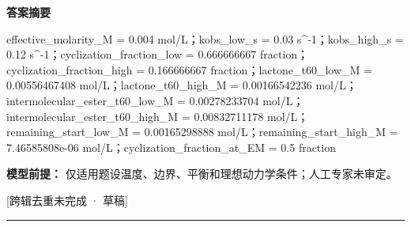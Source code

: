 \documentclass[UTF8,11pt,a4paper]{ctexart}
\begin{document}
\noindent\textbf{答案摘要}\par
effective\_molarity\_M = 0.004 mol/L；kobs\_low\_s = 0.03 s\textasciicircum{}-1；kobs\_high\_s = 0.12 s\textasciicircum{}-1；cyclization\_fraction\_low = 0.666666667 fraction；cyclization\_fraction\_high = 0.166666667 fraction；lactone\_t60\_low\_M = 0.00556467408 mol/L；lactone\_t60\_high\_M = 0.00166542236 mol/L；intermolecular\_ester\_t60\_low\_M = 0.00278233704 mol/L；intermolecular\_ester\_t60\_high\_M = 0.00832711178 mol/L；remaining\_start\_low\_M = 0.00165298888 mol/L；remaining\_start\_high\_M = 7.46585808e-06 mol/L；cyclization\_fraction\_at\_EM = 0.5 fraction\par
\noindent\textbf{模型前提：}
仅适用题设温度、边界、平衡和理想动力学条件；人工专家未审定。\par
\noindent\textcolor{red!65!black}{[跨辑去重未完成 · 草稿]} \par
\medskip\hrule\medskip
{}
\end{document}
